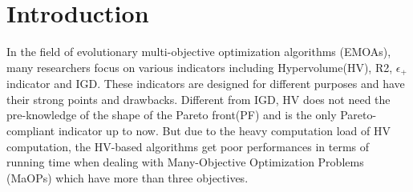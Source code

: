 \documentclass[conference]{IEEEtran}
\begin{document}
%
\IEEEpeerreviewmaketitle

% 
\section{Introduction}
In the field of evolutionary multi-objective optimization algorithms (EMOAs), 
many researchers focus on various indicators including Hypervolume(HV)\cite{hypervolume}, R2\cite{R2}, $\epsilon_+$ indicator\cite{e+} and IGD\cite{IGD}.
These indicators are designed for different purposes and 
have their strong points and drawbacks. Different from IGD, 
HV does not need the pre-knowledge of the shape of the Pareto front(PF) 
and is the only Pareto-compliant indicator up to now\cite{pareto_compliant}. 
But due to the heavy computation load of HV computation\cite{hypervolume:computationLoad}, 
the HV-based algorithms get poor performances in terms of running time when dealing with Many-Objective Optimization Problems (MaOPs) which have more than three objectives. 
\end{document}
